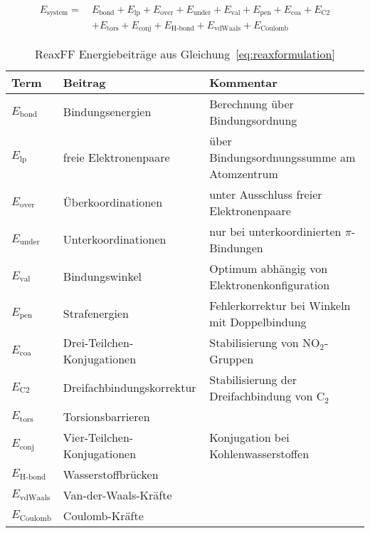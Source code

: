 \begin{align}
  \label{eq:reaxformulation}
  E_\text{system} =~& E_\text{bond} + E_\text{lp} + E_\text{over} + E_\text{under} + E_\text{val} + E_\text{pen} + E_\text{coa} + E_\text{C2} \\
  \nonumber  & + E_\text{tors} + E_\text{conj} + E_\text{H-bond} + E_\text{vdWaals} + E_\text{Coulomb}
\end{align}


\begin{table}
  \caption[ReaxFF Energiebeiträge]{ReaxFF Energiebeiträge aus Gleichung~\ref{eq:reaxformulation}}
  \label{tab:reaxenergies}
  \begin{tabularx}{\textwidth}{|llX|}
    \hline
    \textbf{Term}      & \textbf{Beitrag}            & \textbf{Kommentar}                            \\
    \hline
    $E_\text{bond}$    & Bindungsenergien            & Berechnung über Bindungsordnung               \\
    $E_\text{lp}$      & freie Elektronenpaare       & über Bindungsordnungssumme am Atomzentrum     \\
    $E_\text{over}$    & Überkoordinationen          & unter Ausschluss freier Elektronenpaare       \\
    $E_\text{under}$   & Unterkoordinationen         & nur bei unterkoordinierten $\pi$-Bindungen    \\
    $E_\text{val}$     & Bindungswinkel              & Optimum abhängig von Elektronenkonfiguration  \\
    $E_\text{pen}$     & Strafenergien               & Fehlerkorrektur bei Winkeln mit Doppelbindung \\
    $E_\text{coa}$     & Drei-Teilchen-Konjugationen & Stabilisierung von NO$_2$-Gruppen             \\
    $E_\text{C2}$      & Dreifachbindungskorrektur   & Stabilisierung der Dreifachbindung von C$_2$  \\
    $E_\text{tors}$    & Torsionsbarrieren           &                                               \\
    $E_\text{conj}$    & Vier-Teilchen-Konjugationen & Konjugation bei Kohlenwasserstoffen           \\
    $E_\text{H-bond}$  & Wasserstoffbrücken          &                                               \\
    $E_\text{vdWaals}$ & Van-der-Waals-Kräfte        &                                               \\
    $E_\text{Coulomb}$ & Coulomb-Kräfte              &                                               \\
    \hline
  \end{tabularx}
\end{table}

